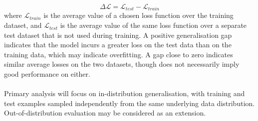 {\begin{equation}
    \Delta \mathcal{L} = \mathcal{L}_{test} - \mathcal{L}_{train}
\end{equation}
where $\mathcal{L}_{train}$ is the average value of a chosen loss function over the training dataset, and $\mathcal{L}_{test}$ is the average value of the same loss function over a separate test dataset that is not used during training. A positive generalisation gap indicates that the model incurs a greater loss on the test data than on the training data, which may indicate overfitting. A gap close to zero indicates similar average losses on the two datasets, though does not necessarily imply good performance on either.\\
~\\
Primary analysis will focus on in-distribution generalisation, with training and test examples sampled independently from the same underlying data distribution. Out-of-distribution evaluation may be considered as an extension.
\par
}

